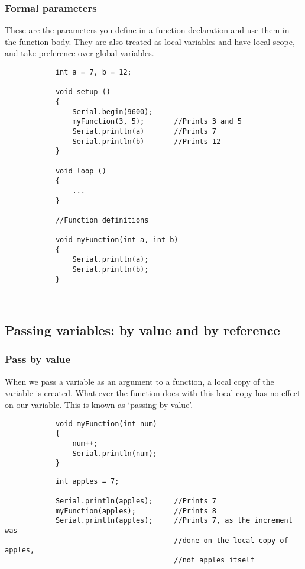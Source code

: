 \documentclass{article}
\begin{document}
		\subsubsection{Formal parameters}

			These are the parameters you define in a function declaration and use them in the function body. They are also treated as local variables and have local scope, and take preference over global variables.

			\begin{lstlisting}
			int a = 7, b = 12;

			void setup ()
			{
				Serial.begin(9600);
				myFunction(3, 5);		//Prints 3 and 5
				Serial.println(a)		//Prints 7
				Serial.println(b)		//Prints 12
			}

			void loop ()
			{
				...
			}

			//Function definitions

			void myFunction(int a, int b)
			{
				Serial.println(a);
				Serial.println(b);
			}

			
			\end{lstlisting}
				

	\subsection{Passing variables: by value and by reference}

		\subsubsection{Pass by value}

			When we pass a variable as an argument to a function, a local copy of the variable is created. What ever the function does with this local copy has no effect on our variable. This is known as `passing by value'.

			\begin{lstlisting}
			void myFunction(int num)
			{
				num++;
				Serial.println(num);
			}
			\end{lstlisting}

			\begin{lstlisting}
			int apples = 7;

			Serial.println(apples);		//Prints 7
			myFunction(apples);			//Prints 8
			Serial.println(apples);		//Prints 7, as the increment was
										//done on the local copy of apples,
										//not apples itself
			\end{lstlisting}
\end{document}
